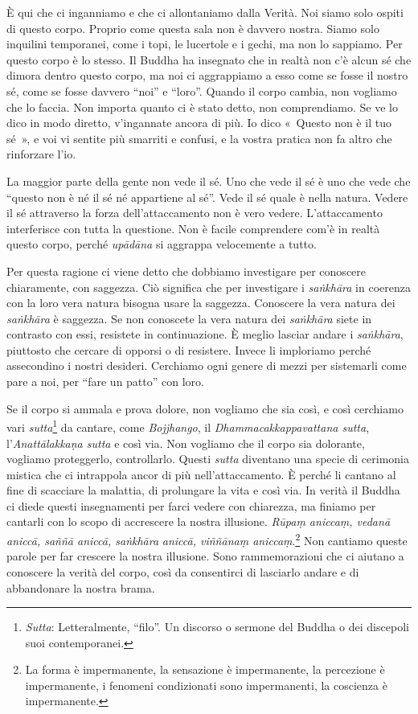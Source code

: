 È qui che ci inganniamo e che ci allontaniamo dalla Verità. Noi siamo
solo ospiti di questo corpo. Proprio come questa sala non è davvero
nostra. Siamo solo inquilini temporanei, come i topi, le lucertole e i
gechi, ma non lo sappiamo. Per questo corpo è lo stesso. Il Buddha ha
insegnato che in realtà non c'è alcun sé che dimora dentro questo corpo,
ma noi ci aggrappiamo a esso come se fosse il nostro sé, come se fosse
davvero ``noi'' e ``loro''. Quando il corpo cambia, non vogliamo che lo
faccia. Non importa quanto ci è stato detto, non comprendiamo. Se ve lo
dico in modo diretto, v'ingannate ancora di più. Io dico «~Questo non è
il tuo sé~», e voi vi sentite più smarriti e confusi, e la vostra
pratica non fa altro che rinforzare l'io.

La maggior parte della gente non vede il sé. Uno che vede il sé è uno
che vede che ``questo non è né il sé né appartiene al sé''. Vede il sé
quale è nella natura. Vedere il sé attraverso la forza
dell'attaccamento non è vero vedere. L'attaccamento interferisce con
tutta la questione. Non è facile comprendere com'è in realtà questo
corpo, perché \emph{upādāna} si aggrappa velocemente a tutto.

Per questa ragione ci viene detto che dobbiamo investigare per conoscere
chiaramente, con saggezza. Ciò significa che per investigare i
\emph{saṅkhāra} in coerenza con la loro vera natura bisogna usare la
saggezza. Conoscere la vera natura dei \emph{saṅkhāra} è saggezza. Se
non conoscete la vera natura dei \emph{saṅkhāra} siete in contrasto con
essi, resistete in continuazione. È meglio lasciar andare i
\emph{saṅkhāra}, piuttosto che cercare di opporsi o di resistere. Invece
li imploriamo perché assecondino i nostri desideri. Cerchiamo ogni
genere di mezzi per sistemarli come pare a noi, per ``fare un patto''
con loro.

Se il corpo si ammala e prova dolore, non vogliamo che sia così, e così
cerchiamo vari \emph{sutta}\footnote{\emph{Sutta}: Letteralmente,
  ``filo''. Un discorso o sermone del Buddha o dei discepoli suoi
  contemporanei.} da cantare, come \emph{Bojjhango}, il
\emph{Dhammacakkappavattana sutta}, l'\emph{Anattālakkaṇa sutta} e così
via. Non vogliamo che il corpo sia dolorante, vogliamo proteggerlo,
controllarlo. Questi \emph{sutta} diventano una specie di cerimonia
mistica che ci intrappola ancor di più nell'attaccamento. È perché li
cantano al fine di scacciare la malattia, di prolungare la vita e così
via. In verità il Buddha ci diede questi insegnamenti per farci vedere
con chiarezza, ma finiamo per cantarli con lo scopo di accrescere la
nostra illusione. \emph{Rūpaṃ aniccaṃ, vedanā aniccā, saññā aniccā,
saṅkhāra} \emph{aniccā, viññānaṃ aniccaṃ}.\footnote{La forma è
  impermanente, la sensazione è impermanente, la percezione è
  impermanente, i fenomeni condizionati sono impermanenti, la coscienza
  è impermanente.} Non cantiamo queste parole per far crescere la nostra
illusione. Sono rammemorazioni che ci aiutano a conoscere la verità del
corpo, così da consentirci di lasciarlo andare e di abbandonare la
nostra brama.

